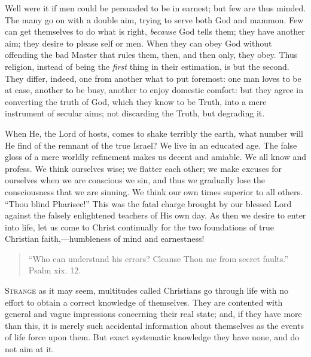 Well were it if men could be persuaded to be in
earnest; but few are thus minded. The many go on with a
double aim, trying to serve both God and mammon. Few can
get themselves to do what is right, \emph{because} God
tells them; they have another aim; they desire to please
self or men. When they can obey God without offending the
bad Master that rules them, then, and then only, they
obey. Thus religion, instead of being the \emph{first}
thing in their estimation, is but the second. They
differ, indeed, one from another what to put foremost:
one man loves to be at ease, another to be busy, another
to enjoy domestic comfort: but they agree in converting
the truth of God, which they know to be Truth, into a
mere instrument of secular aims; not discarding the
Truth, but degrading it.

When He, the Lord of hosts, comes to shake terribly
the earth, what number will He find of the remnant of the
true Israel? We live in an educated age. The false gloss
of a mere worldly refinement makes us decent and amiable.
We all know and profess. We think ourselves wise; we
flatter each other; we make excuses for ourselves when we
are conscious we sin, and thus we gradually lose the
consciousness that we are sinning. We think our own times
superior to all others. ``Thou blind Pharisee!''
This was the fatal charge brought by our blessed Lord
against the falsely enlightened teachers of His own day.
As then we desire to enter into life, let us come to
Christ continually for the two foundations of true
Christian faith,—humbleness of mind and earnestness!


\begin{quote}

``Who can understand his errors? Cleanse Thou
me from secret faults.'' Psalm xix. 12.

\end{quote}

S\textsc{trange} as it may seem, multitudes called Christians
go through life with no effort to obtain a correct
knowledge of themselves. They are contented with general
and vague impressions concerning their real state; and,
if they have more than this, it is merely such accidental
information about themselves as the events of life force
upon them. But exact systematic knowledge they have none,
and do not aim at it.

